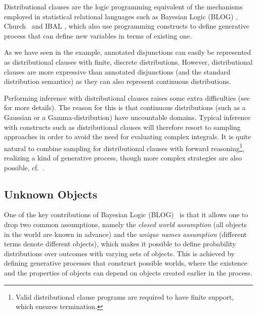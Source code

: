 \documentclass[a4paper]{article}
\begin{document}
Distributional clauses are 
the logic programming equivalent of the mechanisms employed in
statistical relational languages such as Bayesian Logic (BLOG)
\citep{Milch05}, Church~\citep{Goodman08} and IBAL \citep{Pfeffer01}, which also use programming
constructs to define generative process that can define 
new variables in terms of existing one.

As we have seen in the example, annotated disjunctions can easily be
represented as distributional clauses with finite, discrete
distributions.  
However, distributional clauses are more expressive than annotated
disjunctions (and the standard distribution semantics) as they can also represent continuous distributions. 


Performing inference with distributional clauses raises some extra difficulties (see \citep{Gutmann11} for more details). The reason for this 
is that continuous distributions (such as a Gaussian or a Gamma-distribution) 
have uncountable domains. 
Typical inference with constructs such as distributional clauses
will therefore resort to sampling approaches in order to avoid the need for evaluating complex integrals.  
It is quite natural to combine sampling for distributional clauses
with forward reasoning\footnote{Valid distributional clause programs
  are required to have finite support, which ensures termination.}, realizing a kind of generative process, 
though more complex strategies are also possible,
cf.~\citep{Gutmann11}.  



\subsection{Unknown Objects}
One of the key contributions of Bayesian Logic (BLOG)~\citep{Milch05}
is that it allows one to drop two common assumptions, namely the
\emph{closed world assumption} (all objects in the world are known in
advance) and the \emph{unique names assumption} (different terms
denote different objects), which makes it possible 
to define probability distributions over outcomes with varying sets of objects. 
This is achieved by defining generative processes that construct possible worlds, where the existence and the properties of objects can depend on objects created earlier in the process.  
\end{document}
